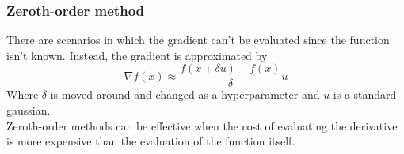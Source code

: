 \subsubsection{Zeroth-order method}
There are scenarios in which the gradient can't be evaluated since the function isn't known. Instead, the gradient is approximated by 
\begin{equation}
  \nabla f(x) \approx \frac{f(x+\delta u) - f(x)}{\delta} u
\end{equation}
Where $\delta$ is moved around and changed as a hyperparameter and $u$ is a standard gaussian.
\\
Zeroth-order methods can be effective when the cost of evaluating the derivative is more expensive than the evaluation of the function itself.
